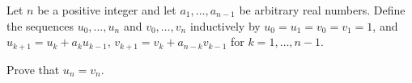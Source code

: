 Let $n$ be a positive integer and let $a_1,\ldots,a_{n-1}$ be arbitrary real numbers. Define the sequences $u_0,\ldots,u_n$ and $v_0,\ldots,v_n$ inductively by $u_0=u_1=v_0=v_1=1$, and $u_{k+1}=u_k+a_ku_{k-1}$, $v_{k+1}=v_k+a_{n-k}v_{k-1}$ for $k=1,\ldots,n-1$.

Prove that $u_n=v_n$.
